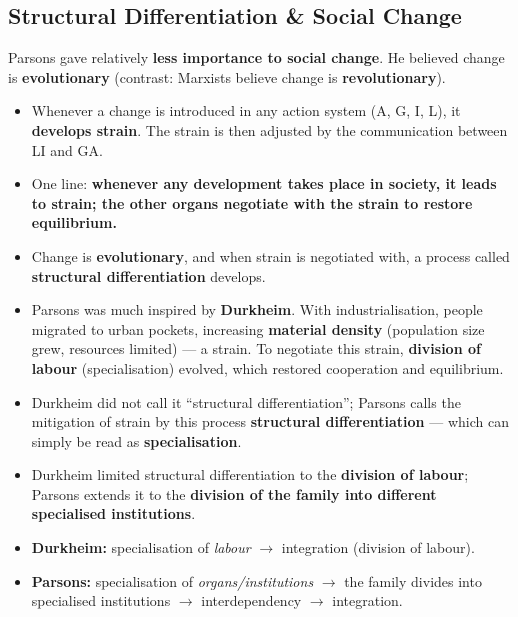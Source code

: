 \sectiondivider

\subsection{Structural Differentiation \& Social Change}

Parsons gave relatively \textbf{less importance to social change}. He believed change is \textbf{evolutionary} (contrast: Marxists believe change is \textbf{revolutionary}).

\begin{KeyConcept}
\begin{itemize}
\item Whenever a change is introduced in any action system (A, G, I, L), it \textbf{develops strain}. The strain is then adjusted by the communication between LI and GA.
\item One line: \textbf{whenever any development takes place in society, it leads to strain; the other organs negotiate with the strain to restore equilibrium.}
\item Change is \textbf{evolutionary}, and when strain is negotiated with, a process called \textbf{structural differentiation} develops.
\end{itemize}
\end{KeyConcept}

\begin{KeyConcept}
\begin{itemize}
\item Parsons was much inspired by \textbf{Durkheim}. With industrialisation, people migrated to urban pockets, increasing \textbf{material density} (population size grew, resources limited) --- a strain. To negotiate this strain, \textbf{division of labour} (specialisation) evolved, which restored cooperation and equilibrium.
\item Durkheim did not call it ``structural differentiation''; Parsons calls the mitigation of strain by this process \textbf{structural differentiation} --- which can simply be read as \textbf{specialisation}.
\item Durkheim limited structural differentiation to the \textbf{division of labour}; Parsons extends it to the \textbf{division of the family into different specialised institutions}.
\end{itemize}
\end{KeyConcept}

\begin{ComparisonBox}
\begin{itemize}
\item \textbf{Durkheim:} specialisation of \textit{labour} $\rightarrow$ integration (division of labour).
\item \textbf{Parsons:} specialisation of \textit{organs/institutions} $\rightarrow$ the family divides into specialised institutions $\rightarrow$ interdependency $\rightarrow$ integration.
\end{itemize}
\end{ComparisonBox}

